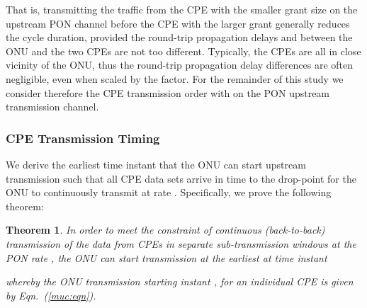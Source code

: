 \documentclass[pdftex,journal]{IEEEtran}
\newtheorem{theorem}{Theorem}
\begin{document}
That is, transmitting the traffic from the CPE
with the smaller grant size  on the upstream PON channel before the
CPE with the larger grant  generally
reduces the cycle duration, provided the
round-trip propagation delays  and 
between the ONU and the two CPEs are not too different.
Typically, the CPEs are all in close vicinity of the ONU, thus
the round-trip propagation delay differences are often
negligible, even when scaled by the  factor.
For the remainder of this study we consider therefore
the CPE transmission order 
with  on the PON upstream transmission channel.

\subsubsection{CPE Transmission Timing} \label{cpesegtime:sec}
We derive the earliest time instant 
that the ONU can start
upstream transmission such that all  CPE data sets arrive in
time to the drop-point for the ONU to continuously transmit at rate
.
Specifically, we prove the following theorem:
\begin{theorem}
In order to meet the constraint of continuous (back-to-back) transmission
of the data from CPEs  in separate sub-transmission windows
at the PON rate , the ONU can start transmission
at the earliest at time instant

whereby the ONU transmission starting instant ,
for an individual CPE  is given by Eqn.~(\ref{muc:eqn}).
\end{theorem}
\end{document}
